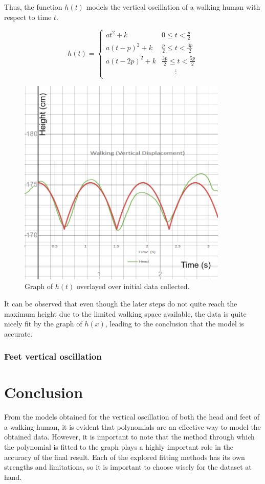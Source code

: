 \documentclass[12pt, a4paper]{article}
\begin{document}
Thus, the function $h(t)$ models the vertical oscillation of a walking human with
respect to time $t$.

\[ h(t)= \begin{cases}
        at^2 + k      & 0            \leq t < \frac{ p}{2} \\
        a(t-p)^2 + k  & \frac{p}{2}  \leq t < \frac{3p}{2} \\
        a(t-2p)^2 + k & \frac{3p}{2} \leq t < \frac{5p}{2} \\
                      & \phantom{t=\,} \vdots              \\
    \end{cases}
\]

\begin{figure}[H]
    \centering
    \includegraphics[width=10cm]{final_graph.png}
    \caption{ Graph of $h(t)$ overlayed over initial data collected.}
    \label{final_graph}
\end{figure}

It can be observed that even though the later steps do not quite reach the
maximum height due to the limited walking space available, the data is quite
nicely fit by the graph of $h(x)$, leading to the conclusion that the model is
accurate.

\subsubsection{Feet vertical oscillation}

\section{Conclusion}
From the models obtained for the vertical oscillation of both the head and feet
of a walking human, it is evident that polynomials are an effective way to model
the obtained data. However, it is important to note that the method through
which the polynomial is fitted to the graph plays a highly important role in the
accuracy of the final result. Each of the explored fitting methods has its own
strengths and limitations, so it is important to choose wisely for the dataset
at hand. \\
\end{document}
